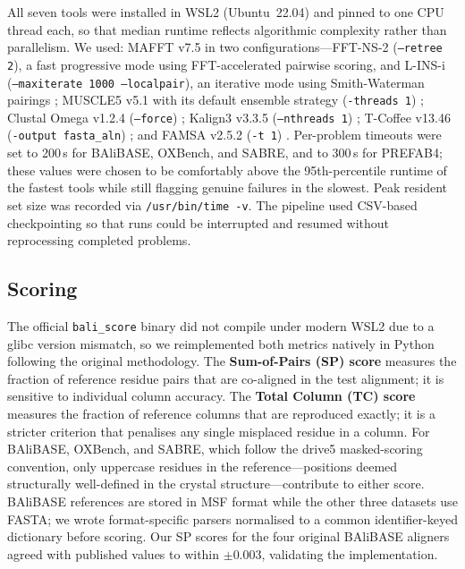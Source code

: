 \documentclass[unnumsec,webpdf,contemporary,large]{oup-authoring-template}
\begin{document}
All seven tools were installed in WSL2 (Ubuntu~22.04) and pinned to one CPU
thread each, so that median runtime reflects algorithmic complexity rather
than parallelism.
We used: MAFFT v7.5 in two configurations---FFT-NS-2
(\texttt{--retree 2}), a fast progressive mode using FFT-accelerated
pairwise scoring, and L-INS-i (\texttt{--maxiterate 1000 --localpair}),
an iterative mode using Smith-Waterman pairings
\citep{katoh2013mafft}; MUSCLE5 v5.1 with its default ensemble strategy
(\texttt{-threads 1}) \citep{edgar2022muscle5}; Clustal Omega v1.2.4
(\texttt{--force}) \citep{sievers2011clustalo}; Kalign3 v3.3.5
(\texttt{--nthreads 1}) \citep{lassmann2020kalign3}; T-Coffee v13.46
(\texttt{-output fasta\_aln}) \citep{notredame2000tcoffee}; and FAMSA
v2.5.2 (\texttt{-t 1}) \citep{deorowicz2016famsa}.
Per-problem timeouts were set to 200\,s for BAliBASE, OXBench, and SABRE,
and to 300\,s for PREFAB4; these values were chosen to be comfortably above
the 95th-percentile runtime of the fastest tools while still flagging
genuine failures in the slowest.
Peak resident set size was recorded via \texttt{/usr/bin/time -v}.
The pipeline used CSV-based checkpointing so that runs could be interrupted
and resumed without reprocessing completed problems.

\subsection{Scoring}

The official \texttt{bali\_score} binary did not compile under modern
WSL2 due to a glibc version mismatch, so we reimplemented both metrics
natively in Python following the original methodology.
The \textbf{Sum-of-Pairs (SP) score} measures the fraction of reference
residue pairs that are co-aligned in the test alignment; it is sensitive
to individual column accuracy.
The \textbf{Total Column (TC) score} measures the fraction of reference
columns that are reproduced exactly; it is a stricter criterion that
penalises any single misplaced residue in a column.
For BAliBASE, OXBench, and SABRE, which follow the drive5 masked-scoring
convention, only uppercase residues in the reference---positions deemed
structurally well-defined in the crystal structure---contribute to either
score.
BAliBASE references are stored in MSF format while the other three datasets
use FASTA; we wrote format-specific parsers normalised to a common
identifier-keyed dictionary before scoring.
Our SP scores for the four original BAliBASE aligners agreed with published
values to within $\pm 0.003$, validating the implementation.
\end{document}
